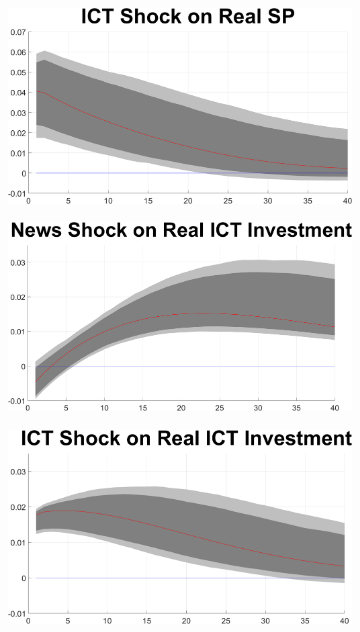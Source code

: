 \documentclass[12pt]{article}
\begin{document}
\begin{figure}[h!]
\begin{subfigure}{.5\textwidth}
\end{subfigure}%
\begin{subfigure}{.5\textwidth}
	\centering
	\includegraphics[width=1\linewidth]{MainFigures/fig_ICT_Shock_on_Real_SP__controllinNEWS_}
\end{subfigure}
\begin{subfigure}{.5\textwidth}
	\centering
	\includegraphics[width=1\linewidth]{MainFigures/fig_News_Shock_on_Real_ICT_Investment__controllinNEWS_}
\end{subfigure}%
\begin{subfigure}{.5\textwidth}
	\centering
	\includegraphics[width=1\linewidth]{MainFigures/fig_ICT_Shock_on_Real_ICT_Investment__controllinNEWS_}

\end{subfigure}
\end{figure}
\end{document}
